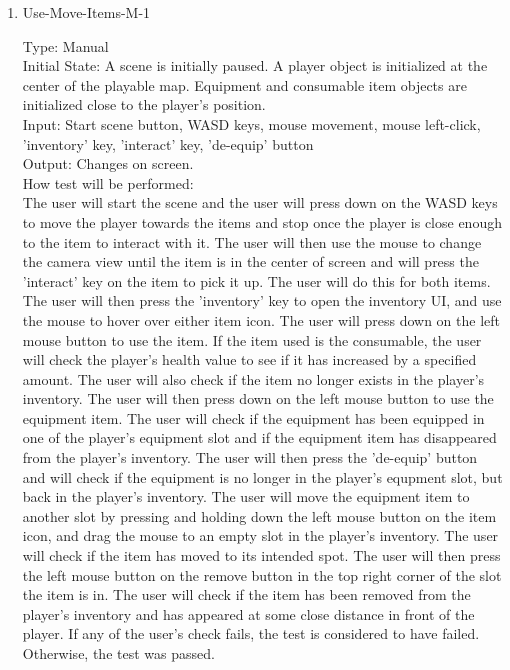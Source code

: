 \documentclass[12pt, titlepage]{article}
\begin{document}
\begin{enumerate}

\item{Use-Move-Items-M-1\\}

Type: Manual \\
					
Initial State: A scene is initially paused. A player object is initialized at the center of the playable map. Equipment and consumable item objects are initialized close to the player's position.\\
					
Input: Start scene button, WASD keys, mouse movement, mouse left-click, 'inventory' key, 'interact' key, 'de-equip' button\\
					
Output: Changes on screen.\\
					
How test will be performed:\\ The user will start the scene and the user will press down on the WASD keys to move the player towards the items and stop once the player is close enough to the item to interact with it. The user will then use the mouse to change the camera view until the item is in the center of screen and will press the 'interact' key on the item to pick it up. The user will do this for both items. The user will then press the 'inventory' key to open the inventory UI, and use the mouse to hover over either item icon. The user will press down on the left mouse button to use the item. If the item used is the consumable, the user will check the player's health value to see if it has increased by a specified amount. The user will also check if the item no longer exists in the player's inventory. The user will then press down on the left mouse button to use the equipment item. The user will check if the equipment has been equipped in one of the player's equipment slot and if the equipment item has disappeared from the player's inventory. The user will then press the 'de-equip' button and will check if the equipment is no longer in the player's equpment slot, but back in the player's inventory. The user will move the equipment item to another slot by pressing and holding down the left mouse button on the item icon, and drag the mouse to an empty slot in the player's inventory. The user will check if the item has moved to its intended spot. The user will then press the left mouse button on the remove button in the top right corner of the slot the item is in. The user will check if the item has been removed from the player's inventory and has appeared at some close distance in front of the player. If any of the user's check fails, the test is considered to have failed. Otherwise, the test was passed.\\

\end{enumerate}
\end{document}
